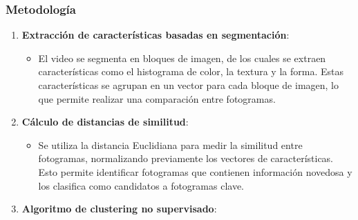 \subsubsection{Metodología}

\begin{enumerate}
	\item \textbf{Extracción de características basadas en segmentación}:
	\begin{itemize}
		\item El video se segmenta en bloques de imagen, de los cuales se extraen características como el histograma de color, la textura y la forma. Estas características se agrupan en un vector para cada bloque de imagen, lo que permite realizar una comparación entre fotogramas.
	\end{itemize}
	
	\item \textbf{Cálculo de distancias de similitud}:
	\begin{itemize}
		\item Se utiliza la distancia Euclidiana para medir la similitud entre fotogramas, normalizando previamente los vectores de características. Esto permite identificar fotogramas que contienen información novedosa y los clasifica como candidatos a fotogramas clave.
	\end{itemize}
	
	\item \textbf{Algoritmo de clustering no supervisado}:
\end{enumerate}


